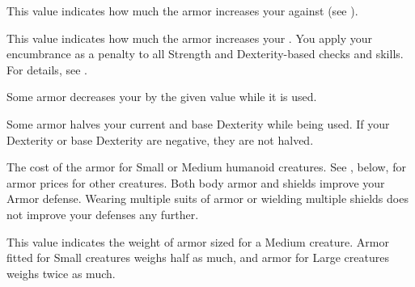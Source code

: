          This value indicates how much the armor increases your  against  (see ).

         This value indicates how much the armor increases your .
        You apply your encumbrance as a penalty to all Strength and Dexterity-based checks and skills.
        For details, see .

         Some armor decreases your  by the given value while it is used.

         Some armor halves your current and base Dexterity while being used.
        If your Dexterity or base Dexterity are negative, they are not halved.

         The cost of the armor for Small or Medium humanoid creatures.
        See , below, for armor prices for other creatures.
         Both body armor and shields improve your Armor defense.
        Wearing multiple suits of armor or wielding multiple shields does not improve your defenses any further.

         This value indicates the weight of armor sized for a Medium creature.
        Armor fitted for Small creatures weighs half as much, and armor for Large creatures weighs twice as much.

